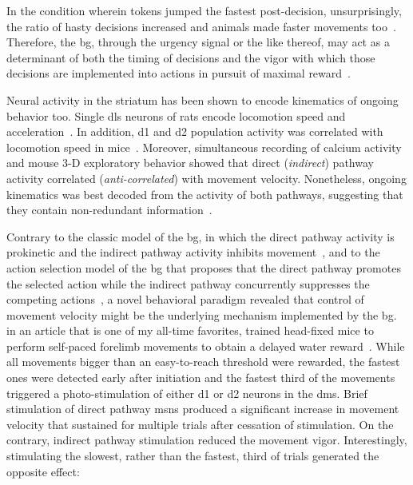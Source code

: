 In the condition wherein tokens jumped the fastest post-decision, unsurprisingly, the ratio of hasty decisions increased and animals made faster movements too~\cite{Thura2014JNeurosci}.
Therefore, the \gls{bg}, through the urgency signal or the like thereof, may act as a determinant of both the timing of decisions and the vigor with which those decisions are implemented into actions in pursuit of maximal reward~\cite{Carland2019NeuroSci}.
\par
Neural activity in the striatum has been shown to encode kinematics of ongoing behavior too.
Single \gls{dls} neurons of rats encode locomotion speed and acceleration~\cite{Rueda2015NN}.
In addition, \gls{d1} and \gls{d2} population activity was correlated with locomotion speed in mice~\cite{Barbera2016Neuron}.
Moreover, simultaneous recording of calcium activity and mouse 3-D exploratory behavior showed that direct (\textit{indirect}) pathway activity correlated (\textit{anti-correlated}) with movement velocity.
Nonetheless, ongoing kinematics was best decoded from the activity of both pathways, suggesting that they contain non-redundant information~\cite{Markowitz2018Cell}.
\par
Contrary to the classic model of the \gls{bg}, in which the direct pathway activity is prokinetic and the indirect pathway activity inhibits movement~\cite{Kravitz2010Nature}, and to the action selection model of the \gls{bg} that proposes that the direct pathway promotes the selected action while the indirect pathway concurrently suppresses the competing actions~\cite{Cui2013Nature}, a novel behavioral paradigm revealed that control of movement velocity might be the underlying mechanism implemented by the \gls{bg}.
 in an article that is one of my all-time favorites, trained head-fixed mice to perform self-paced forelimb movements to obtain a delayed water reward~\cite{Yttri2016Nature}.
While all movements bigger than an easy-to-reach threshold were rewarded, the fastest ones were detected early after initiation and the fastest third of the movements triggered a photo-stimulation of either \gls{d1} or \gls{d2} neurons in the \gls{dms}.
Brief stimulation of direct pathway \glspl{msn} produced a significant increase in movement velocity that sustained for multiple trials after cessation of stimulation.
On the contrary, indirect pathway stimulation reduced the movement vigor.
Interestingly, stimulating the slowest, rather than the fastest, third of trials generated the opposite effect:
